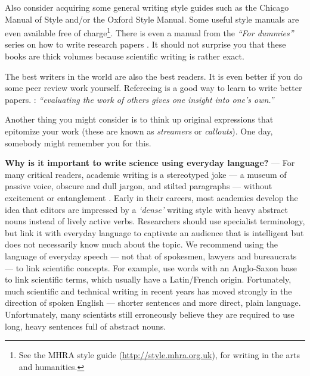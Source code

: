\documentclass[graybox,envcountchap,sectrefs,UStrade]{svmono}
\newenvironment{fminipage}{\begin{Sbox}\begin{minipage}}{\end{minipage}\end{Sbox}\fbox{\TheSbox}}
\begin{document}
Also consider acquiring some general writing style guides such as the Chicago Manual of Style and/or the Oxford Style Manual. Some useful style manuals are even available free of charge\footnote{See the MHRA style guide (\url{http://style.mhra.org.uk}), for writing in the arts and humanities.}. There is even a manual from the \emph{``For dummies''} series on how to write research papers \citep{woods2002research}. It should not surprise you that these books are thick volumes because scientific writing is rather exact. \par

The best writers in the world are also the best readers. It is even better if you do some peer review work yourself. Refereeing is a good way to learn to write better papers. \citet{Smith1990TR}: \emph{``evaluating the work of others gives one insight into one's own.''}\par

Another thing you might consider is to think up original expressions that epitomize your work (these are known as \emph{streamers} or \emph{callouts}). One day, somebody might remember you for this.\par

\bigskip
\begin{fminipage}{.9\textwidth}{\footnotesize{\textsf{\textbf{Why is it important to write science using everyday language?}} --- For many critical readers, academic writing is a stereotyped joke --- a museum of passive voice, obscure and dull jargon, and stilted paragraphs --- without excitement or entanglement \citep{Jasper2002CC,Webster2003EJSS}. Early in their careers, most academics develop the idea that editors are impressed by a \emph{`dense'} writing style with heavy abstract nouns instead of lively active verbs. Researchers should use specialist terminology, but link it with everyday language to captivate an audience that is intelligent but does not necessarily know much about the topic. We recommend using the language of everyday speech --- not that of spokesmen, lawyers and bureaucrats --- to link scientific concepts. For example, use words with an Anglo-Saxon base to link scientific terms, which usually have a Latin/French origin. Fortunately, much scientific and technical writing in recent years has moved strongly in the direction of spoken English --- shorter sentences and more direct, plain language. Unfortunately, many scientists still erroneously believe they are required to use long, heavy sentences full of abstract nouns.}}
\end{fminipage}
\bigskip
\end{document}
